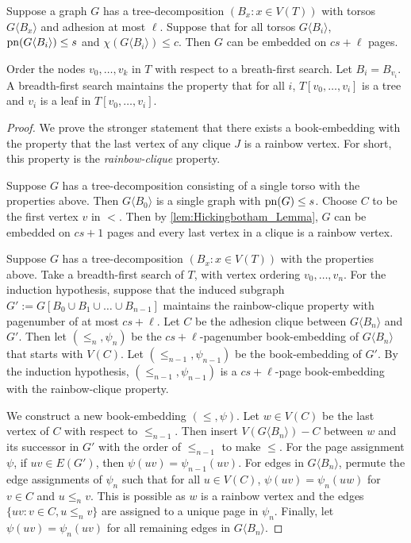 \begin{theorem}
	Suppose a graph \(G\) has a tree-decomposition \((B_x: x \in V(T))\) with torsos \(G \langle B_x \rangle\) and adhesion at most \(\ell\). Suppose that for all torsos $G\langle B_i \rangle$, \(\operatorname{pn}(G\langle B_i \rangle) \leq s\) and \(\chi(G\langle B_i \rangle) \leq c\). Then \(G\) can be embedded on \(cs + \ell\) pages.
\end{theorem}
Order the nodes \(v_0, \ldots, v_k\) in $T$ with respect to a breath-first search. Let $B_i = B_{v_i}$. 
A breadth-first search maintains the property that for all \(i\), \(T[v_0, \ldots, v_{i}]\) is a tree and \(v_i\) is a leaf in \(T[v_0, \ldots, v_{i}]\).
\begin{proof}
	We prove the stronger statement that there exists a book-embedding with the property that the last vertex of any clique \(J\) is a rainbow vertex. For short, this property is the \textit{rainbow-clique} property. 

	Suppose $G$ has a tree-decomposition consisting of a single torso with the properties above. Then \(G\langle B_0 \rangle\) is a single graph with \(\operatorname{pn}(G) \leq s\). Choose \(C\) to be the first vertex \(v\) in \( < \). Then by \cref{lem:Hickingbotham_Lemma}, $G$ can be embedded on \(cs + 1\) pages and every last vertex in a clique is a rainbow vertex.

	Suppose $G$ has a tree-decomposition $(B_x: x \in V(T))$ with the properties above. Take a breadth-first search of $T$, with vertex ordering $v_0, \ldots, v_n$. For the induction hypothesis, suppose that the induced subgraph $G' := G[B_0 \cup B_1 \cup \ldots \cup B_{n-1}]$ maintains the rainbow-clique property with pagenumber of at most \(cs + \ell\).  
	Let \(C\) be the adhesion clique between \(G \langle B_n \rangle\) and $G'$. Then let \((\leq_n, \psi_n)\) be the \(cs + \ell\)-pagenumber book-embedding of \(G \langle B_n \rangle\) that starts with \(V(C)\). Let \((\leq_{n-1}, \psi_{n-1})\) be the book-embedding of \(G'\). By the induction hypothesis, \((\leq_{n-1}, \psi_{n-1})\) is a \(cs + \ell\)-page book-embedding with the rainbow-clique property.

	We construct a new book-embedding \((\leq, \psi)\).
	Let \(w \in V(C)\) be the last vertex of \(C\) with respect to \(\leq_{n-1}\). Then insert \(V(G \langle B_n \rangle) - C\) between \(w\) and its successor in $G'$ with the order of \(\leq_{n-1}\) to make $\leq$. For the page assignment \(\psi\), if \(uv \in E(G')\), then \(\psi(uv) = \psi_{n-1}(uv)\). For edges in $G \langle B_n \rangle$, permute the edge assignments of \(\psi_n\) such that for all \(u \in V(C)\), \(\psi(uv) = \psi_n(uw)\) for $v \in C$ and $u \leq_n v$. This is possible as \(w\) is a rainbow vertex and the edges \(\{uv : v \in C, u \leq_n v\}\) are assigned to a unique page in \(\psi_n\). Finally, let \(\psi(uv) = \psi_n(uv)\) for all remaining edges in $G \langle B_n \rangle$. 


\end{proof}
